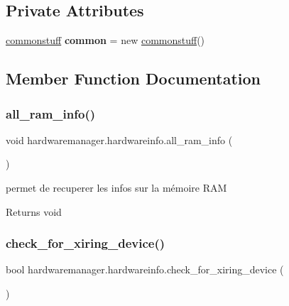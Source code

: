 \subsection*{Private Attributes}
\begin{DoxyCompactItemize}
\item 
\mbox{\label{classhardwaremanager_1_1hardwareinfo_ac6c235050dae6f4bdc5858cb0eedd844}} 
\hyperlink{classcommonmanager_1_1commonstuff}{commonstuff} {\bfseries common} = new \hyperlink{classcommonmanager_1_1commonstuff}{commonstuff}()
\end{DoxyCompactItemize}


\subsection{Member Function Documentation}
\mbox{\label{classhardwaremanager_1_1hardwareinfo_a1752d83d9f8c32ae3f4e3961d3a5f991}} 
\subsubsection{\texorpdfstring{all\+\_\+ram\+\_\+info()}{all\_ram\_info()}}
{\footnotesize\ttfamily void hardwaremanager.\+hardwareinfo.\+all\+\_\+ram\+\_\+info (\begin{DoxyParamCaption}{ }\end{DoxyParamCaption})}



permet de recuperer les infos sur la mémoire R\+AM 

\begin{DoxyReturn}{Returns}
void
\end{DoxyReturn}
\mbox{\label{classhardwaremanager_1_1hardwareinfo_af1347f901af8c5f3dc2cca91fc5505cb}} 
\subsubsection{\texorpdfstring{check\+\_\+for\+\_\+xiring\+\_\+device()}{check\_for\_xiring\_device()}}
{\footnotesize\ttfamily bool hardwaremanager.\+hardwareinfo.\+check\+\_\+for\+\_\+xiring\+\_\+device (\begin{DoxyParamCaption}{ }\end{DoxyParamCaption})}



